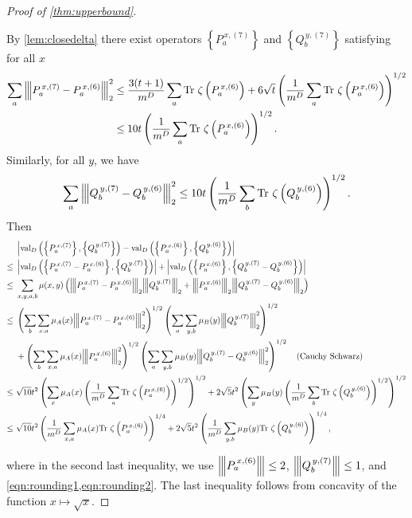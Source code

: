 \documentclass[10pt,a4paper]{article}
\theoremstyle{plain}
\theoremstyle{definition}
\newcommand {\set} [1] {\ensuremath{ \left\lbrace #1 \right\rbrace }}
\newcommand {\br} [1] {\ensuremath{ \left( #1 \right) }}
\newcommand {\ab} [1] {\ensuremath{ \left| #1 \right| }}
\newcommand{\nnorm}[1]{{\left\vert\kern-0.25ex\left\vert\kern-0.25ex\left\vert #1
		\right\vert\kern-0.25ex\right\vert\kern-0.25ex\right\vert}}
\newcommand {\Tr} {\ensuremath{ \mathrm{Tr} }}
\newcommand{\gval}[3]{\ensuremath{\mathrm{val}_{#1}\br{\set{#2},\set{#3}}}}
\newcommand{\Pnn}[1] {\ensuremath{{P^{\,x, (#1)}_a}}}
\newcommand{\Qnn}[1] {\ensuremath{{Q^{\,y, (#1)}_b}}}
\newcommand{\1}{\mathbb{1}} %
\begin{document}
\begin{proof}[Proof of \cref{thm:upperbound}]
\begin{itemize}
By \cref{lem:closedelta} there exist operators $\set{\Pnn{7}}$ and $\set{\Qnn{7}}$ satisfying for all $x$
\begin{align}
\sum_a \nnorm{\Pnn{7}-\Pnn{6}}_2^2&\le\frac{3(t+1)}{m^D}\sum_{a}\Tr~\zeta\br{\Pnn{6}}+6\sqrt{t}\br{\frac{1}{m^D}\sum_{a}\Tr~\zeta\br{\Pnn{6}}}^{1/2} \nonumber\\
&\le10t\br{\frac{1}{m^D}\sum_{a}\Tr~\zeta\br{\Pnn{6}}}^{1/2}\label{eqn:rounding1}.
\end{align}
Similarly, for all $y$, we have
\begin{equation}\label{eqn:rounding2}
\sum_a \nnorm{\Qnn{7}-\Qnn{6}}_2^2\le10t\br{\frac{1}{m^D}\sum_{b}\Tr~\zeta\br{\Qnn{6}}}^{1/2}.
\end{equation}
Then
\begin{align*}
&\ab{\gval{D}{\Pnn{7}}{\Qnn{7}}-\gval{D}{\Pnn{6}}{\Qnn{6}}}\\
\leq~&\ab{\gval{D}{\Pnn{7}-\Pnn{6}}{\Qnn{7}}}+\ab{\gval{D}{\Pnn{6}}{\Qnn{7}-\Qnn{6}}}\\
\leq~&\sum_{x,y,a,b}\mu(x,y)\br{\nnorm{\Pnn{7}-\Pnn{6}}_2\nnorm{\Qnn{7}}_2+\nnorm{\Pnn{6}}_2\nnorm{\Qnn{7}-\Qnn{6}}_2}\\
\leq~&\br{\sum_b\sum_{x,a}\mu_A(x)\nnorm{\Pnn{7}-\Pnn{6}}_2^2}^{1/2}\br{\sum_a\sum_{y,b}\mu_B(y)\nnorm{\Qnn{7}}_2^2}^{1/2}\\
&+\br{\sum_b\sum_{x,a}\mu_A(x)\nnorm{\Pnn{6}}_2^2}^{1/2}\br{\sum_a\sum_{y,b}\mu_B(y)\nnorm{\Qnn{7}-\Qnn{6}}_2^2}^{1/2}\quad\mbox{(Cauchy Schwarz)}\\
\leq~&\sqrt{10}t^2\br{\sum_{x}\mu_A(x)\br{\frac{1}{m^{D}}\sum_{a}\Tr~\zeta\br{\Pnn{6}}}^{1/2}}^{1/2}+2\sqrt{5}t^2\br{\sum_{y}\mu_B(y)\br{\frac{1}{m^{D}}\sum_{b}\Tr~\zeta\br{\Qnn{6}}}^{1/2}}^{1/2}\\
\leq~&\sqrt{10}t^2\br{\frac{1}{m^{D}}\sum_{x, a}\mu_A(x)\Tr~\zeta\br{\Pnn{6}}}^{1/4}+2\sqrt{5}t^2\br{\frac{1}{m^{D}}\sum_{y, b}\mu_B(y)\Tr~\zeta\br{\Qnn{6}}}^{1/4},
\end{align*}
\end{itemize}
where in the second last inequality, we use $\nnorm{\Pnn{6}} \leq 2$, $\nnorm{\Qnn{7}} \leq 1$, and \cref{eqn:rounding1,eqn:rounding2}.
The last inequality follows from concavity of the function $x\mapsto \sqrt{x}$.


\end{proof}
\end{document}
